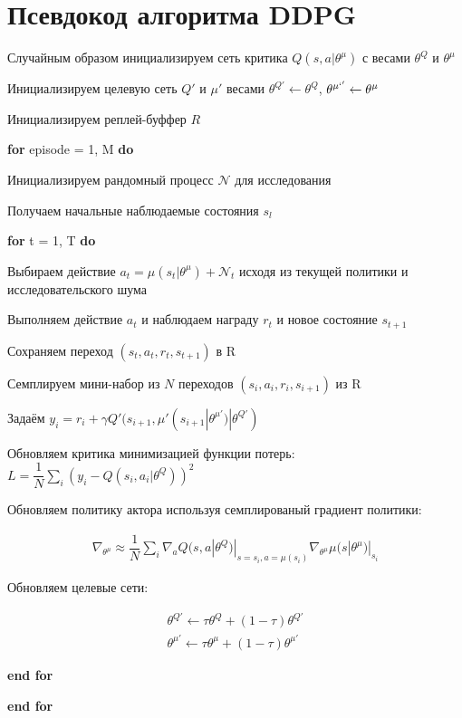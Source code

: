 \chapter{Псевдокод алгоритма DDPG}\label{appendix-ddpg-alg}                            %

\setlength{\parindent}{0em}

Случайным образом инициализируем сеть критика $Q(s, a|\theta^\mu)$ с весами $\theta^Q$ и $\theta^\mu$

Инициализируем целевую сеть $Q'$ и $\mu'$ весами $\theta^{Q'} \leftarrow \theta^Q$, $\theta^{\mu`'} \leftarrow \theta^\mu$

Инициализируем реплей-буффер $R$

\textbf{for} episode = 1, M \textbf{do}

\setlength{\parindent}{1em}

Инициализируем рандомный процесс $\mathcal{N}$ для исследования

Получаем начальные наблюдаемые состояния $s_l$

\textbf{for} t = 1, T \textbf{do}

\setlength{\parindent}{2em}

Выбираем действие $a_t = \mu (s_t | \theta^\mu) + \mathcal{N}_t$ исходя из текущей политики и исследовательского шума

Выполняем действие $a_t$ и наблюдаем награду $r_t$ и новое состояние $s_{t+1}$

Сохраняем переход $(s_t, a_t, r_t, s_{t+1})$ в R

Семплируем мини-набор из $N$ переходов $(s_i, a_i, r_i, s_{i+1})$ из R

Задаём $y_i = r_i + \gamma Q' (s_{i+1}, \mu' (s_{i+1} | \theta^{\mu'})| \theta^{Q'})$

Обновляем критика минимизацией функции потерь: $L = \dfrac{1}{N} \sum_{i} (y_i - Q(s_i, a_i | \theta^Q))^2$

Обновляем политику актора используя семплированый градиент политики:

\begin{equation}
    \begin{multlined}
        \nabla_{\theta^\mu} \approx \dfrac{1}{N} \sum_{i} \nabla_a Q(s, a | \theta^Q) | _{s=s_i, a=\mu(s_i)} \nabla_{\theta^\mu} \mu (s | \theta^\mu) | _{s_i}
    \end{multlined}
\end{equation}

Обновляем целевые сети:

\begin{equation}
    \begin{multlined}
        \theta^{Q'} \leftarrow \tau \theta^Q + (1 - \tau) \theta^{Q'} \\
        \theta^{\mu'} \leftarrow \tau \theta^\mu + (1 - \tau) \theta^{\mu'}
    \end{multlined}
\end{equation}

\setlength{\parindent}{1em}

\textbf{end for}

\setlength{\parindent}{0em}

\textbf{end for}

\setlength{\parindent}{2.5em}
